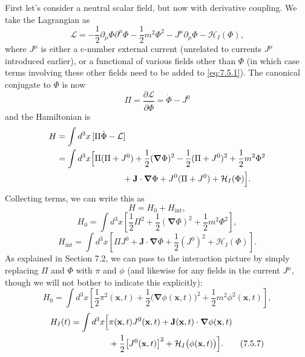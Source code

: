 First let's consider a neutral scalar field, but now with derivative coupling.
We take the Lagrangian as
\begin{equation}
\mathcal L=-\frac12\partial_\mu\Phi\partial^\mu\Phi
-\frac12m^2\Phi^2-J^\mu\partial_\mu\Phi-\mathcal H_I(\Phi),
\tag{7.5.1}\label{eq:7.5.1}
\end{equation}
where $J^\mu$ is either a c-number external current (unrelated to currents
$J^\mu$ introduced earlier), or a functional of various fields other than
$\Phi$ (in which case terms involving these other fields need to be added to
\eqref{eq:7.5.1}). The canonical conjugate to $\Phi$ is now
\begin{equation}
\Pi=\frac{\partial\mathcal L}{\partial\dot\Phi}=\dot\Phi-J^0
\tag{7.5.2}\label{eq:7.5.2}
\end{equation}
and the Hamiltonian is
\begin{align*}
H&=\int d^3x\,[\Pi\dot\Phi-\mathcal L]\notag\\
&=\int d^3x\Bigl[\Pi(\Pi+J^0)+\frac12(\boldsymbol\nabla\Phi)^2
-\frac12(\Pi+J^0)^2+\frac12m^2\Phi^2\notag\\
&\hspace{7.8em}{}+\mathbf J\cdot\boldsymbol\nabla\Phi
+J^0(\Pi+J^0)+\mathcal H_I(\Phi)\Bigr].
\end{align*}
Collecting terms, we can write this as
\begin{equation}
H=H_0+H_{\mathrm{int}},
\tag{7.5.3}\label{eq:7.5.3}
\end{equation}
\begin{equation}
H_0=\int d^3x\left[\frac12\Pi^2+\frac12(\boldsymbol\nabla\Phi)^2
+\frac12m^2\Phi^2\right],
\tag{7.5.4}\label{eq:7.5.4}
\end{equation}
\begin{equation}
H_{\mathrm{int}}=\int d^3x\left[\Pi J^0+\mathbf J\cdot\boldsymbol\nabla\Phi
+\frac12(J^0)^2+\mathcal H_I(\Phi)\right].
\tag{7.5.5}\label{eq:7.5.5}
\end{equation}
As explained in Section 7.2, we can pass to the interaction picture by
simply replacing $\Pi$ and $\Phi$ with $\pi$ and $\phi$ (and likewise for any
fields in the current $J^\mu$, though we will not bother to indicate this
explicitly):
\begin{equation}
H_0=\int d^3x\left[\frac12\pi^2(\mathbf x,t)
+\frac12\bigl(\boldsymbol\nabla\phi(\mathbf x,t)\bigr)^2
+\frac12m^2\phi^2(\mathbf x,t)\right],
\tag{7.5.6}\label{eq:7.5.6}
\end{equation}
\begin{align}
H_I(t)=\int d^3x\Bigl[&\pi(\mathbf x,t)J^0(\mathbf x,t)
+\mathbf J(\mathbf x,t)\cdot\boldsymbol\nabla\phi(\mathbf x,t)\notag\\
&+\frac12\bigl[J^0(\mathbf x,t)\bigr]^2
+\mathcal H_I\bigl(\phi(\mathbf x,t)\bigr)\Bigr].
\tag{7.5.7}\label{eq:7.5.7}
\end{align}
